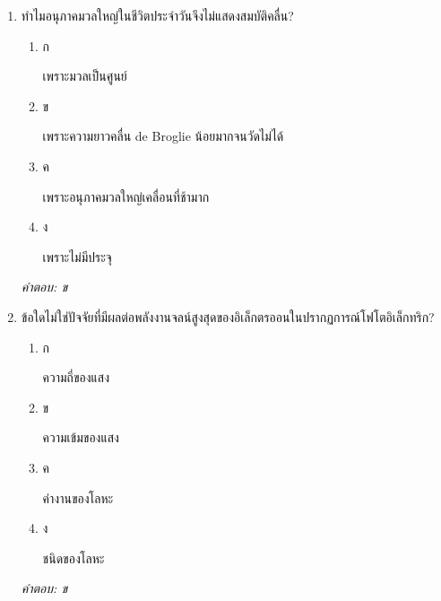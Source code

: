 \documentclass[12pt]{article}
\begin{document}
\begin{enumerate}[label=\arabic*., itemsep=0.5\baselineskip, topsep=0.5\baselineskip, leftmargin=*]
\item ทำไมอนุภาคมวลใหญ่ในชีวิตประจำวันจึงไม่แสดงสมบัติคลื่น?
\begin{enumerate}[label=\alph*)., itemsep=0.3\baselineskip, topsep=0.3\baselineskip]
\item ก\ 
\begin{minipage}[t]{0.9\linewidth}
\raggedright เพราะมวลเป็นศูนย์
\end{minipage}
\item ข\ 
\begin{minipage}[t]{0.9\linewidth}
\raggedright เพราะความยาวคลื่น de Broglie น้อยมากจนวัดไม่ได้
\end{minipage}
\item ค\ 
\begin{minipage}[t]{0.9\linewidth}
\raggedright เพราะอนุภาคมวลใหญ่เคลื่อนที่ช้ามาก
\end{minipage}
\item ง\ 
\begin{minipage}[t]{0.9\linewidth}
\raggedright เพราะไม่มีประจุ
\end{minipage}
\end{enumerate}
\vspace{-0.3\baselineskip}
\begin{small}
\textit{คำตอบ: ข}
\end{small}

\item ข้อใดไม่ใช่ปัจจัยที่มีผลต่อพลังงานจลน์สูงสุดของอิเล็กตรออนในปรากฏการณ์โฟโตอิเล็กทริก?
\begin{enumerate}[label=\alph*)., itemsep=0.3\baselineskip, topsep=0.3\baselineskip]
\item ก\ 
\begin{minipage}[t]{0.9\linewidth}
\raggedright ความถี่ของแสง
\end{minipage}
\item ข\ 
\begin{minipage}[t]{0.9\linewidth}
\raggedright ความเข้มของแสง
\end{minipage}
\item ค\ 
\begin{minipage}[t]{0.9\linewidth}
\raggedright ค่างานของโลหะ
\end{minipage}
\item ง\ 
\begin{minipage}[t]{0.9\linewidth}
\raggedright ชนิดของโลหะ
\end{minipage}
\end{enumerate}
\vspace{-0.3\baselineskip}
\begin{small}
\textit{คำตอบ: ข}
\end{small}


\end{enumerate}
\end{document}
